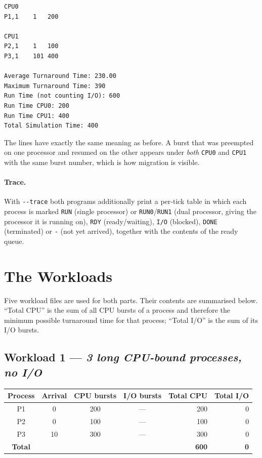 \documentclass[11pt,a4paper]{article}
\begin{document}
\begin{lstlisting}
CPU0
P1,1	1	200

CPU1
P2,1	1	100
P3,1	101	400

Average Turnaround Time: 230.00
Maximum Turnaround Time: 390
Run Time (not counting I/O): 600
Run Time CPU0: 200
Run Time CPU1: 400
Total Simulation Time: 400
\end{lstlisting}

The lines have exactly the same meaning as before. A burst that was preempted on one
processor and resumed on the other appears under \emph{both} \texttt{CPU0} and
\texttt{CPU1} with the same burst number, which is how migration is visible.

\paragraph{Trace.} With \texttt{-{}-trace} both programs additionally print a per-tick table
in which each process is marked \texttt{RUN} (single processor) or \texttt{RUN0}/\texttt{RUN1}
(dual processor, giving the processor it is running on), \texttt{RDY} (ready/waiting),
\texttt{I/O} (blocked), \texttt{DONE} (terminated) or \texttt{-} (not yet arrived), together
with the contents of the ready queue.
\newpage

\section{The Workloads}

Five workload files are used for both parts. Their contents are summarised below.
``Total CPU'' is the sum of all CPU bursts of a process and therefore the minimum possible
turnaround time for that process; ``Total I/O'' is the sum of its I/O bursts.

\subsection*{Workload 1 --- \textit{3 long CPU-bound processes, no I/O}}
\begin{center}\small\begin{tabular}{ccccrr}\toprule
Process & Arrival & CPU bursts & I/O bursts & Total CPU & Total I/O \\\midrule
P1 & 0 & 200 & --- & 200 & 0 \\
P2 & 0 & 100 & --- & 100 & 0 \\
P3 & 10 & 300 & --- & 300 & 0 \\
\midrule
\textbf{Total} & & & & \textbf{600} & \textbf{0} \\
\bottomrule\end{tabular}\end{center}
\end{document}
